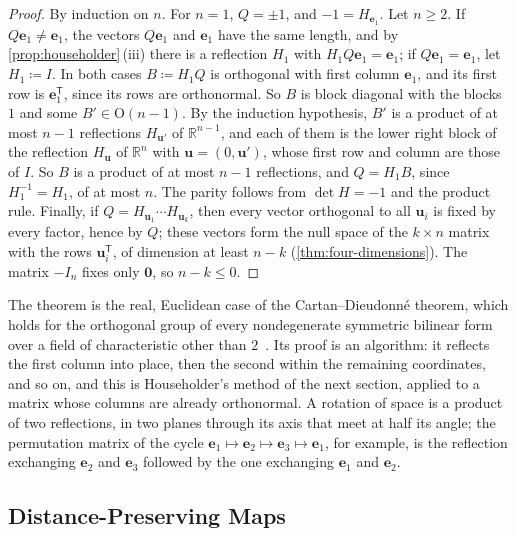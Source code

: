 \begin{proof}
By induction on $n$. For $n=1$, $Q=\pm1$, and $-1=H_{\mathbf e_1}$. Let $n\ge2$. If $Q\mathbf e_1\ne\mathbf e_1$, the vectors $Q\mathbf e_1$ and $\mathbf e_1$ have the same length, and by \cref{prop:householder}\,(iii) there is a reflection $H_1$ with $H_1Q\mathbf e_1=\mathbf e_1$; if $Q\mathbf e_1=\mathbf e_1$, let $H_1\coloneqq I$. In both cases $B\coloneqq H_1Q$ is orthogonal with first column $\mathbf e_1$, and its first row is $\mathbf e_1^{\mathsf T}$, since its rows are orthonormal. So $B$ is block diagonal with the blocks $1$ and some $B'\in\mathrm O(n-1)$. By the induction hypothesis, $B'$ is a product of at most $n-1$ reflections $H_{\mathbf u'}$ of $\mathbb R^{n-1}$, and each of them is the lower right block of the reflection $H_{\mathbf u}$ of $\mathbb R^n$ with $\mathbf u=(0,\mathbf u')$, whose first row and column are those of $I$. So $B$ is a product of at most $n-1$ reflections, and $Q=H_1B$, since $H_1^{-1}=H_1$, of at most $n$. The parity follows from $\det H=-1$ and the product rule. Finally, if $Q=H_{\mathbf u_1}\cdots H_{\mathbf u_k}$, then every vector orthogonal to all $\mathbf u_i$ is fixed by every factor, hence by $Q$; these vectors form the null space of the $k\times n$ matrix with the rows $\mathbf u_i^{\mathsf T}$, of dimension at least $n-k$ (\cref{thm:four-dimensions}). The matrix $-I_n$ fixes only $\mathbf 0$, so $n-k\le0$.
\end{proof}

The theorem is the real, Euclidean case of the Cartan--Dieudonn\'e theorem, which holds for the orthogonal group of every nondegenerate symmetric bilinear form over a field of characteristic other than $2$~\cite{artin1957geometric}. Its proof is an algorithm: it reflects the first column into place, then the second within the remaining coordinates, and so on, and this is Householder's method of the next section, applied to a matrix whose columns are already orthonormal. A rotation of space is a product of two reflections, in two planes through its axis that meet at half its angle; the permutation matrix of the cycle $\mathbf e_1\mapsto\mathbf e_2\mapsto\mathbf e_3\mapsto\mathbf e_1$, for example, is the reflection exchanging $\mathbf e_2$ and $\mathbf e_3$ followed by the one exchanging $\mathbf e_1$ and $\mathbf e_2$.

\subsection{Distance-Preserving Maps}

